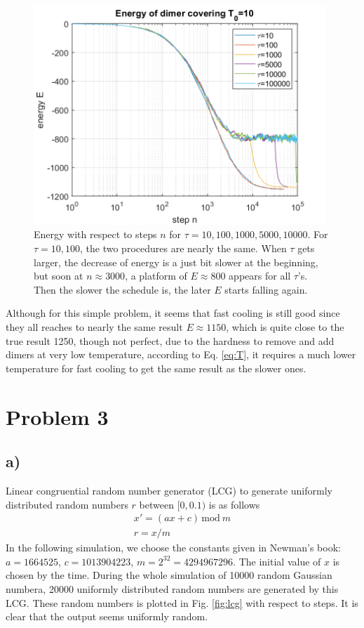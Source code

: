 \documentclass[12pt, graphicx]{article}
\begin{document}
\begin{figure}[ht]
\centering
\includegraphics[width = 110mm]{de.png}
\caption{Energy with respect to steps $n$ for $\tau=10, 100, 1000, 5000, 10000$. For $\tau=10,100$, the two procedures are nearly the same. When $\tau$ gets larger, the decrease of energy is a just bit slower at the beginning, but soon at $n\approx3000$, a platform of $E\approx800$ appears for all $\tau$'s. Then the slower the schedule is, the later $E$ starts falling again.}
\label{fig:de}
\end{figure}

Although for this simple problem, it seems that fast cooling is still good since they all reaches to nearly the same result $E\approx1150$, which is quite close to the true result 1250, though not perfect, due to the hardness to remove and add dimers at very low temperature, according to Eq. \ref{eq:T}, it requires a much lower temperature for fast cooling to get the same result as the slower ones. 

\section*{Problem 3}
\subsection*{a)}
Linear congruential random number generator (LCG) to generate uniformly distributed random numbers $r$ between $[0, 0.1)$ is as follows
\begin{equation}
\begin{gathered}
x'=(ax+c)\,\mbox{mod}\: m\\
r=x/m
\end{gathered}
\label{eq:LCG}
\end{equation}
In the following simulation, we choose the constants given in Newman's book: $a=1664525$, $c=1013904223$, $m=2^{32}=4294967296$. The initial value of $x$ is chosen by the time. During the whole simulation of 10000 random Gaussian numbera, 20000 uniformly distributed random numbers are generated by this LCG. These random numbers is plotted in Fig. \ref{fig:lcg} with respect to steps. It is clear that the output seems uniformly random. 
\end{document}
